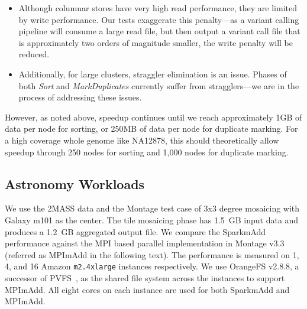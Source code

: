 \documentclass{acm_proc_article-sp}
\begin{document}
\begin{itemize}
\item Although columnar stores have very high read performance, they are limited by write performance.
Our tests exaggerate this penalty---as a variant calling pipeline will consume a large read file, but then
output a variant call file that is approximately two orders of magnitude smaller, the write penalty will be
reduced.
\item Additionally, for large clusters, straggler elimination is an issue. Phases of both \textit{Sort} and
\textit{MarkDuplicates} currently suffer from stragglers---we are in the process of addressing these
issues.
\end{itemize}

However, as noted above, speedup continues until we reach approximately 1GB of data per node for
sorting, or 250MB of data per node for duplicate marking. For a high coverage whole genome like
NA12878, this should theoretically allow speedup through 250 nodes for sorting and 1,000 nodes for
duplicate marking.

\subsection{Astronomy Workloads}
\label{sec:astro-workloads}

We use the 2MASS data and the Montage test case of 3x3 degree mosaicing with Galaxy m101 as the
center.  The tile mosaicing phase has 1.5~GB input data and produces a 1.2~GB aggregated output file.
We compare the SparkmAdd performance against the MPI based parallel implementation in Montage v3.3
(referred as MPImAdd in the following text). The performance is measured on 1, 4, and 16 Amazon
\texttt{m2.4xlarge} instances respectively. We use OrangeFS v2.8.8, a successor of PVFS~\cite{PVFS}, as
the shared file system across the instances to support MPImAdd. All eight cores on each instance are used
for both SparkmAdd and MPImAdd.
\end{document}
